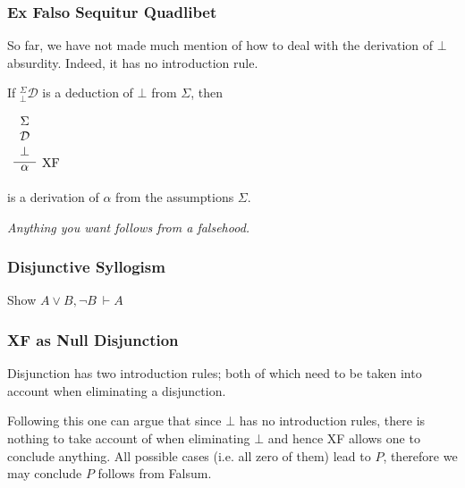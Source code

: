 \documentclass{beamer}
\begin{document}
\begin{frame}
	\frametitle{Ex Falso Sequitur Quadlibet}
	
	So far, we have not made much mention of how to deal with the derivation of $\bot$ absurdity. Indeed, it has no introduction rule. 
	
	\vspace{0.5cm}
		
	If $^{\Sigma}_{\bot}\mathcal{D}$ is a deduction of $\bot$ from $\Sigma$, then
	
	\begin{center}		
		$\begin{array}{c}		
		\infer[\text{XF}]{\alpha}
		{\begin{array}{c} \Sigma \\ \mathcal{D} \\ \bot \end{array}}
		\end{array}$
	\end{center}

	is a derivation of $\alpha$ from the assumptions $\Sigma$.
	
	\vspace{0.5cm}
	
	\emph{Anything you want follows from a falsehood.} %
	 
\end{frame}

\begin{frame}
	\frametitle{Disjunctive Syllogism}
	
	Show $A \lor B, \lnot B \ \vdash A$
	\vspace{7cm}
	
\end{frame}

\begin{frame}
	\frametitle{XF as Null Disjunction}

	Disjunction has two introduction rules; both of which need to be taken into account when eliminating a disjunction. 

	Following this one can argue that since $\bot$ has no introduction rules, there is nothing to take account of when eliminating $\bot$ and hence XF allows one to conclude anything. All possible cases (i.e. all zero of them) lead to $P$, therefore we may conclude $P$ follows from Falsum. 

	\vspace{30mm}

\end{frame}
\end{document}
